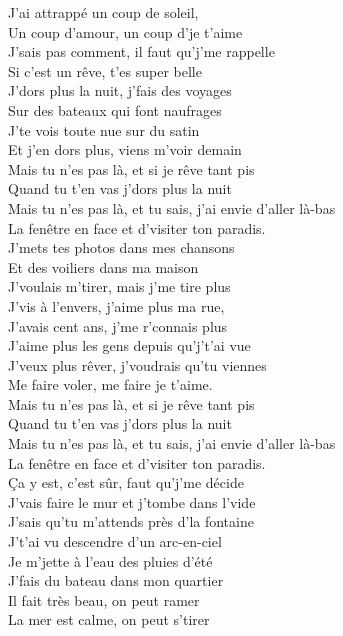 \documentclass{novel}
\begin{document}
\begin{multicols}{2}

J'ai attrappé un coup de soleil, \\
Un coup d'amour, un coup d'je t'aime \\
J'sais pas comment, il faut qu'j'me rappelle \\
Si c'est un rêve, t'es super belle \\
J'dors plus la nuit, j'fais des voyages \\
Sur des bateaux qui font naufrages \\
J'te vois toute nue sur du satin \\
Et j'en dors plus, viens m'voir demain \\

Mais tu n'es pas là, et si je rêve tant pis \\
Quand tu t'en vas j'dors plus la nuit \\
Mais tu n'es pas là, et tu sais, j'ai envie d'aller là-bas \\
La fenêtre en face et d'visiter ton paradis. \\

J'mets tes photos dans mes chansons \\
Et des voiliers dans ma maison \\
J'voulais m'tirer, mais j'me tire plus \\
J'vis à l'envers, j'aime plus ma rue, \\
J'avais cent ans, j'me r'connais plus \\
J'aime plus les gens depuis qu'j't'ai vue \\
J'veux plus rêver, j'voudrais qu'tu viennes \\
Me faire voler, me faire je t'aime. \\

Mais tu n'es pas là, et si je rêve tant pis \\
Quand tu t'en vas j'dors plus la nuit \\
Mais tu n'es pas là, et tu sais, j'ai envie d'aller là-bas \\
La fenêtre en face et d'visiter ton paradis. \\

Ça y est, c'est sûr, faut qu'j'me décide \\
J'vais faire le mur et j'tombe dans l'vide \\
J'sais qu'tu m'attends près d'la fontaine \\
J't'ai vu descendre d'un arc-en-ciel \\
Je m'jette à l'eau des pluies d'été \\
J'fais du bateau dans mon quartier \\
Il fait très beau, on peut ramer \\
La mer est calme, on peut s'tirer \\


\end{multicols}
\end{document}

